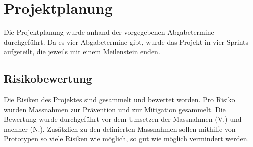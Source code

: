 \section{Projektplanung}

Die Projektplanung wurde anhand der vorgegebenen Abgabetermine durchgeführt.
Da es vier Abgabetermine gibt, wurde das Projekt in vier Sprints aufgeteilt, die jeweils mit einem Meilenstein enden. 

\subsection{Risikobewertung}

Die Risiken des Projektes sind gesammelt und bewertet worden. Pro Risiko wurden Massnahmen zur Prävention und zur Mitigation gesammelt. Die Bewertung wurde durchgeführt vor dem Umsetzen der Massnahmen (V.) und nachher (N.).
Zusätzlich zu den definierten Massnahmen sollen mithilfe von Prototypen so viele Risiken wie möglich, so gut wie möglich vermindert werden. 


